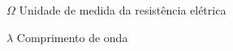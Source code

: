 
\begin{simbolos}
    \item[$ \Omega $] Unidade de medida da resistência elétrica
    \item[$ \lambda $] Comprimento de onda
\end{simbolos}

